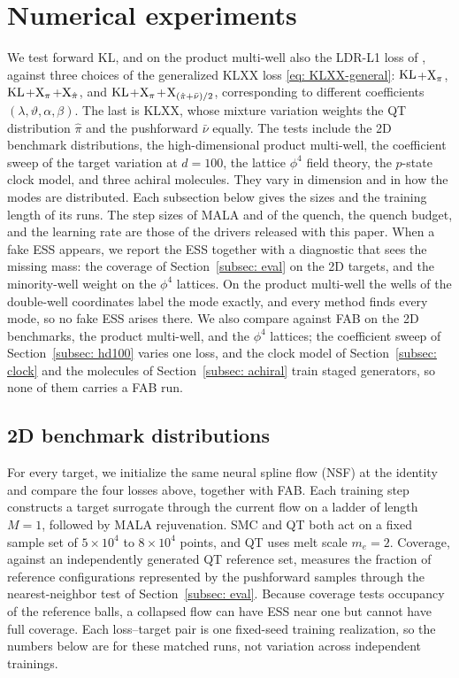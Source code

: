 \documentclass{article}
\begin{document}
\section{Numerical experiments}
\label{sec: experiments}

We test forward KL, and on the product multi-well also the LDR-L1 loss of \citet{schopmans2026ldr}, against three choices of the generalized KLXX loss \eqref{eq: KLXX-general}: $\mathrm{KL}$+$\mathrm{X}_\pi$, $\mathrm{KL}$+$\mathrm{X}_\pi$+$\mathrm{X}_{\hat\pi}$, and $\mathrm{KL}$+$\mathrm{X}_\pi$+$\mathrm{X}_{(\hat\pi+\bar\nu)/2}$, corresponding to different coefficients $(\lambda,\vartheta,\alpha,\beta)$. The last is KLXX, whose mixture variation weights the QT distribution $\hat\pi$ and the pushforward $\bar\nu$ equally. The tests include the 2D benchmark distributions, the high-dimensional product multi-well, the coefficient sweep of the target variation at $d=100$, the lattice $\phi^4$ field theory, the $p$-state clock model, and three achiral molecules. They vary in dimension and in how the modes are distributed. Each subsection below gives the sizes and the training length of its runs. The step sizes of MALA and of the quench, the quench budget, and the learning rate are those of the drivers released with this paper. When a fake ESS appears, we report the ESS together with a diagnostic that sees the missing mass: the coverage of Section~\ref{subsec: eval} on the 2D targets, and the minority-well weight on the $\phi^4$ lattices. On the product multi-well the wells of the double-well coordinates label the mode exactly, and every method finds every mode, so no fake ESS arises there. We also compare against FAB \citep{midgley2022flow} on the 2D benchmarks, the product multi-well, and the $\phi^4$ lattices; the coefficient sweep of Section~\ref{subsec: hd100} varies one loss, and the clock model of Section~\ref{subsec: clock} and the molecules of Section~\ref{subsec: achiral} train staged generators, so none of them carries a FAB run.

\subsection{2D benchmark distributions}
\label{subsec: 2d-benchmark}

For every target, we initialize the same neural spline flow (NSF) \citep{durkan2019neural} at the identity and compare the four losses above, together with FAB. Each training step constructs a target surrogate through the current flow on a ladder of length $M=1$, followed by MALA rejuvenation. SMC and QT both act on a fixed sample set of $5\times10^4$ to $8\times10^4$ points, and QT uses melt scale $m_e=2$. Coverage, against an independently generated QT reference set, measures the fraction of reference configurations represented by the pushforward samples through the nearest-neighbor test of Section~\ref{subsec: eval}. Because coverage tests occupancy of the reference balls, a collapsed flow can have ESS near one but cannot have full coverage. Each loss--target pair is one fixed-seed training realization, so the numbers below are for these matched runs, not variation across independent trainings.
\end{document}

